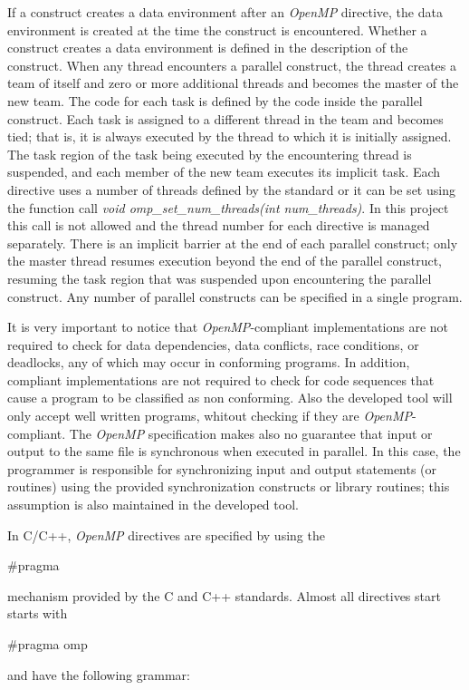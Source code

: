\documentclass[a4paper,11pt,oneside]{book}
\begin{document}
If a construct creates a data environment after an \emph{OpenMP} directive, the data environment is created at the time the construct is encountered. Whether a construct creates a data environment is defined in the description of the construct. When any thread encounters a parallel construct, the thread creates a team of itself and zero or more additional threads and becomes the master of the new team. The code for each task is defined by the code inside the parallel construct. Each task is assigned to a different thread in the team and becomes tied; that is, it is always executed by the thread to which it is initially assigned. The task region of the task being executed by the encountering thread is suspended, and each member of the new team executes its implicit task. Each directive uses a number of threads defined by the standard or it can be set using the function call \emph{void omp\_set\_num\_threads(int num\_threads)}. In this project this call is not allowed and the thread number for each directive is managed separately. There is an implicit barrier at the end of each parallel construct; only the master thread resumes execution beyond the end of the parallel construct, resuming the task region that was suspended upon encountering the parallel construct. Any number of parallel constructs can be specified in a single program. 

It is very important to notice that \emph{OpenMP}-compliant implementations are not required to check for data dependencies, data conflicts, race conditions, or deadlocks, any of which may occur in conforming programs. In addition, compliant implementations are not required to check for code sequences that cause a program to be classified as non conforming. Also the developed tool will only accept well written programs, whitout checking if they are \emph{OpenMP}-compliant. The \emph{OpenMP} specification makes also no guarantee that input or output to the same file is synchronous when executed in parallel. In this case, the programmer is responsible for synchronizing input and output statements (or routines) using the provided synchronization constructs or library routines; this assumption is also maintained in the developed tool.

In C/C++, \emph{OpenMP} directives are specified by using the\begin{bf} $\#$pragma\end{bf} mechanism provided by the C and C++ standards.  Almost all directives start starts with \begin{bf}$\#$pragma omp\end{bf} and have the following grammar:
\begin{bf}{}\end{bf}
\\
\end{document}
